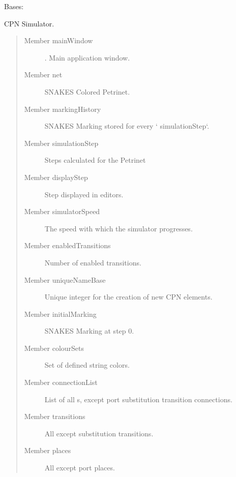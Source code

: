 \documentclass[a4paper,10pt,english]{sphinxmanual}
\begin{document}
\begin{fulllineitems}
\label{model_link:model.CPNSimulator.CPNSimulator}
Bases: 

CPN Simulator.
\begin{quote}\begin{description}
\item[{Member mainWindow}] \leavevmode
{}. Main application window.

\item[{Member net}] \leavevmode
SNAKES Colored Petrinet.

\item[{Member markingHistory}] \leavevmode
SNAKES Marking stored for every {}` simulationStep{}`.

\item[{Member simulationStep}] \leavevmode
Steps calculated for the Petrinet 

\item[{Member displayStep}] \leavevmode
Step displayed in editors.

\item[{Member simulatorSpeed}] \leavevmode
The speed with which the simulator progresses.

\item[{Member enabledTransitions}] \leavevmode
Number of enabled transitions.

\item[{Member uniqueNameBase}] \leavevmode
Unique integer for the creation of new CPN elements.

\item[{Member initialMarking}] \leavevmode
SNAKES Marking at step 0.

\item[{Member colourSets}] \leavevmode
Set of defined string colors.

\item[{Member connectionList}] \leavevmode
List of all  s, except port substitution transition connections.

\item[{Member transitions}] \leavevmode
All  except substitution transitions.

\item[{Member places}] \leavevmode
All  except port places.


\end{description}
\end{quote}
\end{fulllineitems}
\end{document}
